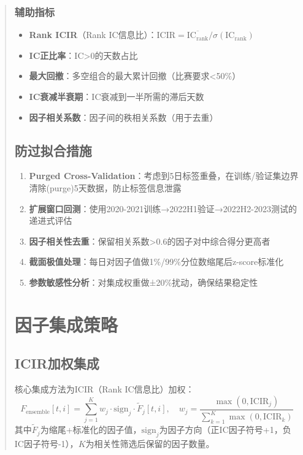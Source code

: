 \documentclass[12pt,a4paper]{article}
\begin{document}
\begin{abstract}
\subsubsection{辅助指标}

\begin{itemize}
    \item \textbf{Rank ICIR}（Rank IC信息比）：$\text{ICIR} = \overline{\text{IC}_{\text{rank}}} / \sigma(\text{IC}_{\text{rank}})$
    \item \textbf{IC正比率}：IC>0的天数占比
    \item \textbf{最大回撤}：多空组合的最大累计回撤（比赛要求<50\%）
    \item \textbf{IC衰减半衰期}：IC衰减到一半所需的滞后天数
    \item \textbf{因子相关系数}：因子间的秩相关系数（用于去重）
\end{itemize}

\subsection{防过拟合措施}

\begin{enumerate}[label=(\arabic*)]
    \item \textbf{Purged Cross-Validation}：考虑到5日标签重叠，在训练/验证集边界清除(purge)5天数据，防止标签信息泄露
    \item \textbf{扩展窗口回测}：使用2020-2021训练→2022H1验证→2022H2-2023测试的递进式评估
    \item \textbf{因子相关性去重}：保留相关系数>0.6的因子对中综合得分更高者
    \item \textbf{截面极值处理}：每日对因子值做1\%/99\%分位数缩尾后z-score标准化
    \item \textbf{参数敏感性分析}：对集成权重做±20\%扰动，确保结果稳定性
\end{enumerate}

\section{因子集成策略}

\subsection{ICIR加权集成}

核心集成方法为ICIR（Rank IC信息比）加权：
\begin{equation}
    F_{\text{ensemble}}[t, i] = \sum_{j=1}^{K} w_j \cdot \text{sign}_j \cdot \tilde{F}_j[t, i], \quad w_j = \frac{\max(0, \text{ICIR}_j)}{\sum_{k=1}^{K} \max(0, \text{ICIR}_k)}
\end{equation}
其中$\tilde{F}_j$为缩尾+标准化的因子值，$\text{sign}_j$为因子方向（正IC因子符号+1，负IC因子符号-1），$K$为相关性筛选后保留的因子数量。


\end{abstract}
\end{document}
